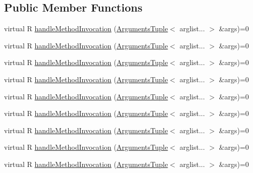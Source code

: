 \subsection*{Public Member Functions}
\begin{DoxyCompactItemize}
\item 
virtual R \mbox{\hyperlink{structfakeit_1_1ActualInvocationHandler_ad44424f6b71c6d5587e80057771d1717}{handle\+Method\+Invocation}} (\mbox{\hyperlink{namespacefakeit_a476a37a598825e1b5dd67b3a176491a1}{Arguments\+Tuple}}$<$ arglist... $>$ \&args)=0
\item 
virtual R \mbox{\hyperlink{structfakeit_1_1ActualInvocationHandler_ad44424f6b71c6d5587e80057771d1717}{handle\+Method\+Invocation}} (\mbox{\hyperlink{namespacefakeit_a476a37a598825e1b5dd67b3a176491a1}{Arguments\+Tuple}}$<$ arglist... $>$ \&args)=0
\item 
virtual R \mbox{\hyperlink{structfakeit_1_1ActualInvocationHandler_ad44424f6b71c6d5587e80057771d1717}{handle\+Method\+Invocation}} (\mbox{\hyperlink{namespacefakeit_a476a37a598825e1b5dd67b3a176491a1}{Arguments\+Tuple}}$<$ arglist... $>$ \&args)=0
\item 
virtual R \mbox{\hyperlink{structfakeit_1_1ActualInvocationHandler_ad44424f6b71c6d5587e80057771d1717}{handle\+Method\+Invocation}} (\mbox{\hyperlink{namespacefakeit_a476a37a598825e1b5dd67b3a176491a1}{Arguments\+Tuple}}$<$ arglist... $>$ \&args)=0
\item 
virtual R \mbox{\hyperlink{structfakeit_1_1ActualInvocationHandler_ad44424f6b71c6d5587e80057771d1717}{handle\+Method\+Invocation}} (\mbox{\hyperlink{namespacefakeit_a476a37a598825e1b5dd67b3a176491a1}{Arguments\+Tuple}}$<$ arglist... $>$ \&args)=0
\item 
virtual R \mbox{\hyperlink{structfakeit_1_1ActualInvocationHandler_ad44424f6b71c6d5587e80057771d1717}{handle\+Method\+Invocation}} (\mbox{\hyperlink{namespacefakeit_a476a37a598825e1b5dd67b3a176491a1}{Arguments\+Tuple}}$<$ arglist... $>$ \&args)=0
\item 
virtual R \mbox{\hyperlink{structfakeit_1_1ActualInvocationHandler_ad44424f6b71c6d5587e80057771d1717}{handle\+Method\+Invocation}} (\mbox{\hyperlink{namespacefakeit_a476a37a598825e1b5dd67b3a176491a1}{Arguments\+Tuple}}$<$ arglist... $>$ \&args)=0
\item 
virtual R \mbox{\hyperlink{structfakeit_1_1ActualInvocationHandler_ad44424f6b71c6d5587e80057771d1717}{handle\+Method\+Invocation}} (\mbox{\hyperlink{namespacefakeit_a476a37a598825e1b5dd67b3a176491a1}{Arguments\+Tuple}}$<$ arglist... $>$ \&args)=0
\item 
virtual R \mbox{\hyperlink{structfakeit_1_1ActualInvocationHandler_ad44424f6b71c6d5587e80057771d1717}{handle\+Method\+Invocation}} (\mbox{\hyperlink{namespacefakeit_a476a37a598825e1b5dd67b3a176491a1}{Arguments\+Tuple}}$<$ arglist... $>$ \&args)=0
\end{DoxyCompactItemize}


